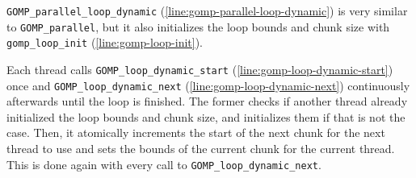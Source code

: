 \texttt{GOMP_parallel_loop\_dynamic} (\cref{line:gomp-parallel-loop-dynamic}) is very similar to
\texttt{GOMP\_parallel}, but it also initializes the loop bounds and chunk size with
\texttt{gomp\_loop\_init} (\cref{line:gomp-loop-init}).

 Each thread calls \texttt{GOMP\_loop\_dynamic\_start} (\cref{line:gomp-loop-dynamic-start}) once
 and \texttt{GOMP\_loop\_dynamic\_next} (\cref{line:gomp-loop-dynamic-next}) continuously afterwards
 until the loop is finished. The former checks if another thread already initialized the loop bounds
 and chunk size, and initializes them if that is not the case. Then, it atomically increments the
 start of the next chunk for the next thread to use and sets the bounds of the current chunk for the
 current thread. This is done again with every call to \texttt{GOMP\_loop\_dynamic\_next}.

 \pagebreak

